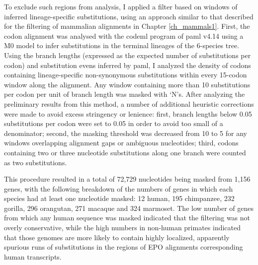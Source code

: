 To exclude such regions from analysis, I applied a filter based on
windows of inferred lineage-specific substitutions, using an approach
similar to that described for the filtering of mammalian alignments in
Chapter \ref{ch_mammals1}. First, the codon alignment was analysed
with the codeml program of \ac{paml} v4.14 using a M0 model to infer
substitutions in the terminal lineages of the 6-species tree. Using
the branch lengths (expressed as the expected number of substitutions
per codon) and substitution evens inferred by \ac{paml}, I analyzed
the density of codons containing lineage-specific non-synonymous
substitutions within every 15-codon window along the alignment. Any
window containing more than 10 \nsyn substitutions per codon per unit
of branch length was masked with `N's. After analyzing the preliminary
results from this method, a number of additional heuristic corrections
were made to avoid excess stringency or lenience: first, branch
lengths below 0.05 substitutions per codon were set to 0.05 in order
to avoid too small of a denominator; second, the masking threshold was
decreased from 10 to 5 for any windows overlapping alignment gaps or
ambiguous nucleotides; third, codons containing two or three
nucleotide substitutions along one branch were counted as two \nsyn
substitutions.

This procedure resulted in a total of 72,729 nucleotides being masked
from 1,156 genes, with the following breakdown of the numbers of genes
in which each species had at least one nucleotide masked: 12 human,
195 chimpanzee, 232 gorilla, 296 orangutan, 271 macaque and 324
marmoset.  The low number of genes from which any human sequence was
masked indicated that the filtering was not overly conservative, while
the high numbers in non-human primates indicated that those genomes
are more likely to contain highly localized, apparently spurious runs
of \nsyn substitutions in the regions of EPO alignments corresponding
human transcripts.

